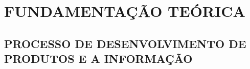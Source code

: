 \chapter{FUNDAMENTAÇÃO TEÓRICA}
\lipsum[1-1]
\section{PROCESSO DE DESENVOLVIMENTO DE PRODUTOS E A INFORMAÇÃO}
\lipsum[1-5]








 






